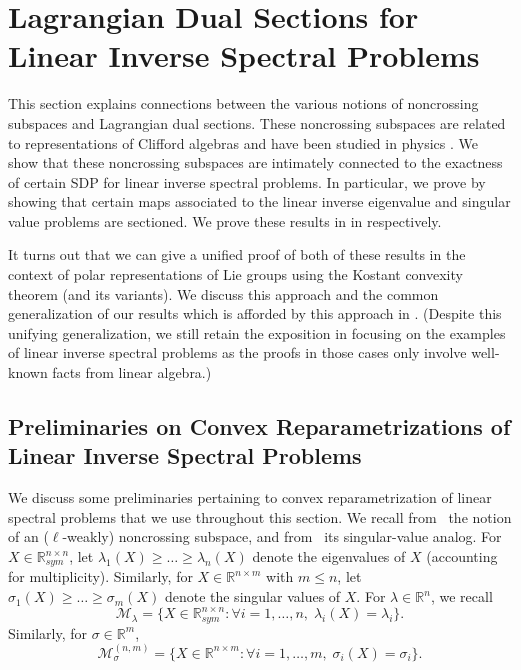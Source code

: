 \documentclass{article}
\numberwithin{equation}{section}
\newcommand{\R}{\mathbb{R}}
\newcommand{\cM}{{\mathcal{M}}}
\begin{document}
\section{Lagrangian Dual Sections for Linear Inverse Spectral Problems}\label{sec:noncrossing}

This section explains connections between the various notions of noncrossing subspaces and Lagrangian dual sections. These noncrossing subspaces 
are related to representations of Clifford algebras and have been studied in physics \cite{crossing, von1993verhalten}.
We show that these noncrossing subspaces are intimately connected to the exactness of certain SDP for linear inverse spectral problems.  In particular, we prove  by showing that certain maps associated to the linear inverse eigenvalue and singular value problems are sectioned. We prove these results in  in  respectively.

It turns out that we can give a unified proof of both of these results in the context of polar representations of Lie groups using the Kostant convexity theorem (and its variants). We discuss this approach and the common generalization of our results which is afforded by this approach in .  (Despite this unifying generalization, we still retain the exposition in  focusing on the examples of linear inverse spectral problems as the proofs in those cases only involve well-known facts from linear algebra.)

\subsection{Preliminaries on Convex Reparametrizations of Linear Inverse Spectral Problems}
We discuss some preliminaries pertaining to convex reparametrization of linear spectral problems that we use throughout this section.  We recall from~ the notion of an ($\ell$-weakly) noncrossing subspace, and from~ its singular-value analog.
For $X \in \R^{n \times n}_{sym}$, let $\lambda_1(X) \ge \dots \ge \lambda_n(X)$ denote the eigenvalues of $X$ (accounting for multiplicity). Similarly, for $X \in \R^{n \times m}$ with $m \le n$, let $\sigma_1(X) \ge \dots \ge \sigma_m(X)$ denote the singular values of $X$. 
For $\lambda \in \R^n$, we recall
\[
    \cM_{\lambda} = \{X \in \R^{n \times n}_{sym} : \forall i = 1, \dots, n,\; \lambda_i(X) = \lambda_i\}.
\]
Similarly, for $\sigma \in \R^m$,  
\[
    \cM^{(n,m)}_{\sigma} = \{X \in \R^{n \times m} : \forall i = 1, \dots, m,\; \sigma_i(X) = \sigma_i\}.
\]
\end{document}
